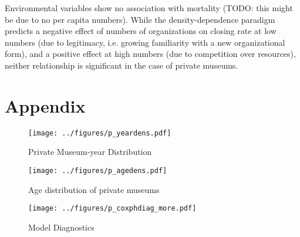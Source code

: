 \documentclass[11pt]{article}
\begin{document}
Environmental variables show no association with mortality (TODO: this might be due to no per capita numbers).
While the density-dependence paradigm predicts a negative effect of numbers of organizations on closing rate at low numbers (due to legitimacy, i.e. growing familiarity with a new organizational form), and a positive effect at high numbers (due to competition over resources), neither relationship is significant in the case of private museums. 




\begin{sloppypar}
\printbibliography
\end{sloppypar}




\section*{Appendix}


\begin{figure}[htbp]
\centering
\texttt{[image: ../figures/p\_yeardens.pdf]}
\caption{\label{fig:p_yeardens}Private Museum-year Distribution}
\end{figure}

\begin{figure}[htbp]
\centering
\texttt{[image: ../figures/p\_agedens.pdf]}
\caption{\label{fig:p_agedens}Age distribution of private museums}
\end{figure}


\begin{figure}[htbp]
\centering
\texttt{[image: ../figures/p\_coxphdiag\_more.pdf]}
\caption{\label{fig:p_coxphdiag_more}Model Diagnostics}
\end{figure}
\end{document}
